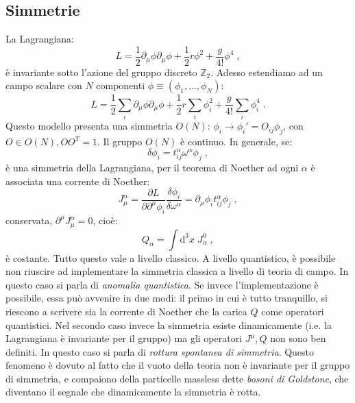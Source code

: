 \documentclass[12pt,a4paper]{article}
\theoremstyle{definition}
\numberwithin{equation}{section}
\newcommand{\diff}[1][]{\mathrm{d}#1}
\begin{document}
\subsection{Simmetrie}
La Lagrangiana:
$$
L=\frac{1}{2}\partial_{\mu}\phi\partial_{\mu}\phi+\frac{1}{2}r\phi^2+\frac{g}{4!}\phi^4\;,
$$
è invariante sotto l'azione del gruppo discreto $\mathbb{Z}_2$. Adesso estendiamo ad un campo scalare con $N$ componenti $\phi\equiv (\phi_1,\ldots,\phi_N)$:
\begin{equation}
L=\frac{1}{2}\sum_i\partial_{\mu}\phi\partial_{\mu}\phi+\frac{1}{2}r\sum_i\phi_i^2+\frac{g}{4!}\sum_i\phi_i^4\;. \label{sec6_oN}
\end{equation}
Questo modello presenta una simmetria $O(N)$: $\phi_i\to \phi_i'=O_{ij}\phi_j$, con $O\in O(N), OO^T=1$. Il gruppo $O(N)$ è continuo. In generale, se:
$$
\delta\phi_i=t^{\alpha}_{ij}\omega^{\alpha}\phi_j\;,
$$
è una simmetria della Lagrangiana, per il teorema di Noether ad ogni $\alpha$ è associata una corrente di Noether:
$$
J_{\mu}^{\alpha}=\frac{\partial L}{\partial\partial^{\mu}\phi_i}\frac{\delta\phi_i}{\delta\omega^{\alpha}}=\partial_{\mu}\phi_it^{\alpha}_{ij}\phi_j\;,
$$
conservata, $\partial^{\mu}J^{\alpha}_{\mu}=0$, cioè:
$$
Q_{\alpha}=\int\diff^3{x}\; J^0_{\alpha}\;,
$$
è costante. Tutto questo vale a livello classico. A livello quantistico, è possibile non riuscire ad implementare la simmetria classica a livello di teoria di campo. In questo caso si parla di \emph{anomalia quantistica}. Se invece l'implementazione è possibile, essa può avvenire in due modi: il primo in cui è  tutto tranquillo, si riescono a scrivere sia la corrente di Noether che la carica $Q$ come operatori quantistici. Nel secondo caso invece la simmetria esiste dinamicamente (i.e. la Lagrangiana è invariante per il gruppo) ma gli operatori $J^{\mu},Q$ non sono ben definiti. In questo caso si parla di \emph{rottura spontanea di simmetria}. Questo fenomeno è dovuto al fatto che il vuoto della teoria non è invariante per il gruppo di simmetria, e compaiono della particelle massless dette \emph{bosoni di Goldstone}, che  diventano il segnale che dinamicamente la simmetria è rotta.\\
\end{document}
